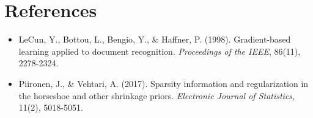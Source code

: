 \documentclass[10pt, letterpaper]{article}
\begin{document}
\section{References}

\begin{itemize}
  \item LeCun, Y., Bottou, L., Bengio, Y., \& Haffner, P. (1998). Gradient-based learning applied to document recognition. \textit{Proceedings of the IEEE}, 86(11), 2278-2324.
  \item Piironen, J., \& Vehtari, A. (2017). Sparsity information and regularization in the horseshoe and other shrinkage priors. \textit{Electronic Journal of Statistics}, 11(2), 5018-5051.
\end{itemize}
\end{document}
